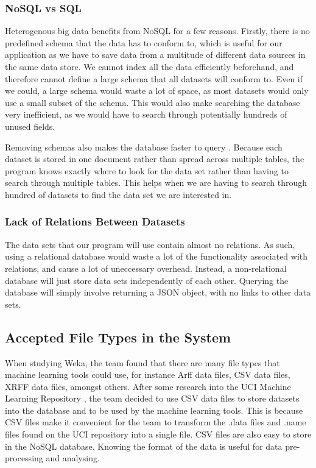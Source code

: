 \documentclass[titlepage]{article}
\begin{document}
\subsubsection{NoSQL vs SQL}
Heterogenous big data benefits from NoSQL for a few reasons. Firstly, there is no predefined schema that the data has to conform to, which is useful for our application as we have to save data from a multitude of different data sources in the same data store. We cannot index all the data efficiently beforehand, and therefore cannot define a large schema that all datasets will conform to. Even if we could, a large schema would waste a lot of space, as most datasets would only use a small subset of the schema. This would also make searching the database very inefficient, as we would have to search through potentially hundreds of unused fields.

Removing schemas also makes the database faster to query \cite{sqlvsnosql}. Because each dataset is stored in one document rather than spread across multiple tables, the program knows exactly where to look for the data set rather than having to search through multiple tables. This helps when we are having to search through hundred of datasets to find the data set we are interested in.

\subsubsection{Lack of Relations Between Datasets}
The data sets that our program will use contain almost no relations. As such, using a relational database would waste a lot of the functionality associated with relations, and cause a lot of uneccessary overhead. Instead, a non-relational database will just store data sets independently of each other. Querying the database will simply involve returning a JSON object, with no links to other data sets.

\subsection{Accepted File Types in the System}

When studying Weka, the team found that there are many file types that machine learning tools could use, for instance Arff data files, CSV data files, XRFF data files, amongst others. After some research into the UCI Machine Learning Repository \cite{uci}, the team decided to use CSV data files to store datasets into the database and to be used by the machine learning tools. This is because CSV files make it convenient for the team to transform the .data files and .name files found on the UCI repository into a single file. CSV files are also easy to store in the NoSQL database. Knowing the format of the data is useful for data pre-processing and analysing.
\end{document}
